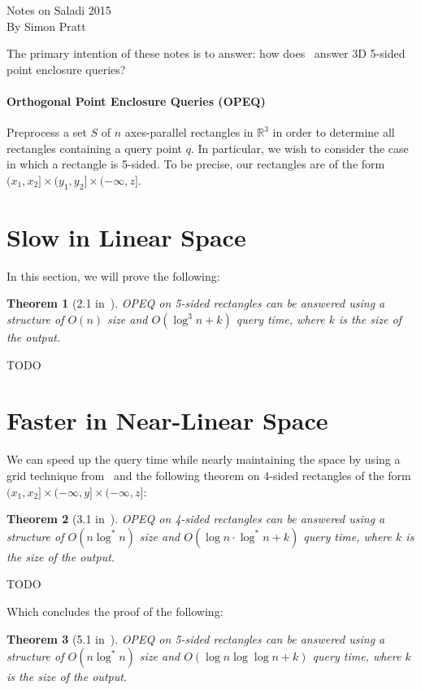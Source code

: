 \documentclass[letterpaper,12pt,twocolumn]{article}
\newcommand{\BigOh}[1]{O\!\left(#1\right)}
\newcommand\IR{\mathbb{R}}
\newcommand\bounds[1]{(#1]} %
\theoremstyle{plain}
\newtheorem{theorem}{Theorem}
\begin{document}
{\noindent\Large Notes on Saladi 2015}\\
{\noindent\large By Simon Pratt}

The primary intention of these notes is to answer: how
does~\cite{saladi2015improved} answer 3D 5-sided point enclosure
queries?

\paragraph{Orthogonal Point Enclosure Queries (OPEQ)}
Preprocess a set $S$ of $n$ axes-parallel rectangles in $\IR^3$ in
order to determine all rectangles containing a query point $q$.  In
particular, we wish to consider the case in which a rectangle is
5-sided.  To be precise, our rectangles are of the form
$\bounds{x_1,x_2} \times \bounds{y_1, y_2} \times \bounds{-\infty,z}$.

\section{Slow in Linear Space}

In this section, we will prove the following:

\begin{theorem}[2.1 in~\cite{saladi2015improved}]

  OPEQ on 5-sided rectangles can be answered using a structure of
  $\BigOh{n}$ size and $\BigOh{\log^3 n + k}$ query time, where $k$
  is the size of the output.

\end{theorem}

TODO

\section{Faster in Near-Linear Space}

We can speed up the query time while nearly maintaining the space by
using a grid technique from~\cite{alstrup2000new} and the following
theorem on 4-sided rectangles of the form 
$\bounds{x_1,x_2} \times \bounds{-\infty, y} \times \bounds{-\infty,z}$:

\begin{theorem}[3.1 in~\cite{saladi2015improved}]

  OPEQ on 4-sided rectangles can be answered using a structure of
  $\BigOh{n\log^* n}$ size and $\BigOh{\log n \cdot \log^* n + k}$
  query time, where $k$ is the size of the output.

\end{theorem}

TODO

Which concludes the proof of the following:

\begin{theorem}[5.1 in~\cite{saladi2015improved}]

  OPEQ on 5-sided rectangles can be answered using a structure of
  $\BigOh{n\log^* n}$ size and $\BigOh{\log n \log\log n + k}$ query
  time, where $k$ is the size of the output.

\end{theorem}



\end{document}
